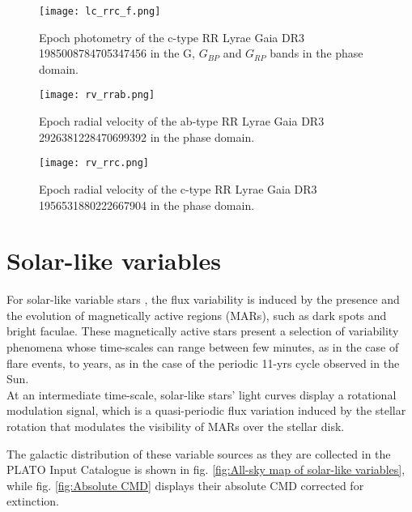 \begin{figure}[H]
\centering
\texttt{[image: lc\_rrc\_f.png]}
\caption{Epoch photometry of the c-type RR Lyrae Gaia DR3 1985008784705347456 in the G, $G_{BP}$ and $G_{RP}$ bands in the phase domain. }
\label{fig:lightcurve_rrc_f}
\end{figure}


\begin{figure}[H]
\centering
\texttt{[image: rv\_rrab.png]}
\caption{Epoch radial velocity of the ab-type RR Lyrae Gaia DR3 2926381228470699392 in the phase domain. }
\label{fig:rv_rrab}
\end{figure}



\begin{figure}[H]
\centering
\texttt{[image: rv\_rrc.png]}
\caption{Epoch radial velocity of the c-type RR Lyrae Gaia DR3 1956531880222667904 in the phase domain. }
\label{fig:rv_rrc}
\end{figure}


\newpage

\section{Solar-like variables}



For solar-like variable stars \parencite{refId8}, the flux variability is induced by the presence and the evolution of magnetically active regions (MARs), such as dark spots and bright faculae.
These magnetically active stars present a selection of variability phenomena whose time-scales can range between
few minutes, as in the case of flare events, to years, as in the
case of the periodic 11-yrs cycle observed in the Sun.\\
At an intermediate time-scale, solar-like
stars’ light curves display a rotational modulation signal, which is a quasi-periodic flux variation induced by the stellar rotation
that modulates the visibility of MARs over the stellar disk.

The galactic distribution of these variable sources as they are collected in the PLATO Input Catalogue is shown in fig. \ref{fig:All-sky map of solar-like variables}, while fig. \ref{fig:Absolute CMD} displays their absolute CMD corrected for extinction. 


